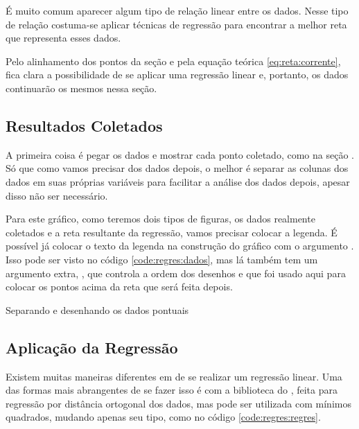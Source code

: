 É muito comum aparecer algum tipo de relação linear entre os dados. Nesse tipo de relação costuma-se aplicar técnicas de regressão para encontrar a melhor reta que representa esses dados.

Pelo alinhamento dos pontos da seção  e pela equação teórica \ref{eq:reta:corrente}, fica clara a possibilidade de se aplicar uma regressão linear e, portanto, os dados continuarão os mesmos nessa seção.


\subsection{Resultados Coletados}

    A primeira coisa é pegar os dados e mostrar cada ponto coletado, como na seção . Só que como vamos precisar dos dados depois, o melhor é separar as colunas dos dados em suas próprias variáveis para facilitar a análise dos dados depois, apesar disso não ser necessário.

    Para este gráfico, como teremos dois tipos de figuras, os dados realmente coletados e a reta resultante da regressão, vamos precisar colocar a legenda. É possível já colocar o texto da legenda na construção do gráfico com o argumento . Isso pode ser visto no código \ref{code:regres:dados}, mas lá também tem um argumento extra, , que controla a ordem dos desenhos e que foi usado aqui para colocar os pontos acima da reta que será feita depois.

    \begin{listing}[H]
        \caption{Separando e desenhando os dados pontuais}
        \label{code:regres:dados}

    \end{listing}


\subsection{Aplicação da Regressão}

    Existem muitas maneiras diferentes em \software de se realizar um regressão linear. Uma das formas mais abrangentes de se fazer isso é com a biblioteca  do \scipy, feita para regressão por distância ortogonal dos dados, mas pode ser utilizada com mínimos quadrados, mudando apenas seu tipo, como no código \ref{code:regres:regres}.

